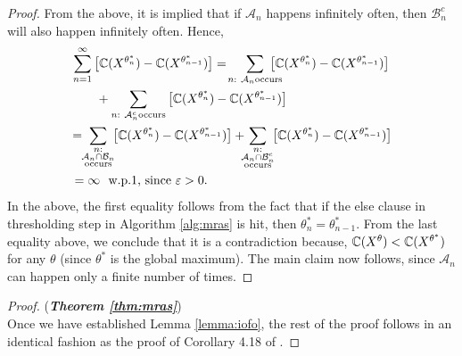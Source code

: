 \begin{proof}
From the above, it is implied that if $\mathcal{A}_n$ happens infinitely often,
then $\mathcal{B}_n^c$ will also happen infinitely often. Hence,
\begin{align*}
&\sum_{n=1}^{\infty}\big[\C(X^{\theta^*_n})-\C(X^{\theta^*_{n-1}})\big] 
=\!\sum_{n:~\mathcal{A}_n \text{occurs}}\!\!\!\!\!\!\!\big[\C(X^{\theta^*_n})-\C(X^{\theta^*_{n-1}})\big]\\
&\qquad+\sum_{n:~\mathcal{A}_n^c \text{occurs}}\big[\C(X^{\theta^*_n})-\C(X^{\theta^*_{n-1}})\big] \\ 
&\!=\!\!\sum_{\substack{n:\\\mathcal{A}_n\cap \mathcal{B}_n\\ \text{occurs}}}\!\!\big[\C(X^{\theta^*_n})-\C(X^{\theta^*_{n-1}})\big] +\!\!\!\sum_{\substack{n:\\\mathcal{A}_n\cap \mathcal{B}_n^c\\ \text{occurs}}}\!\!\big[\C(X^{\theta^*_n})-\C(X^{\theta^*_{n-1}})\big] \\ 
&=\infty \text{~~w.p.1, since $\varepsilon>0$.}
\end{align*}
In the above, the first equality follows from the fact that if the else clause in thresholding step in Algorithm \ref{alg:mras} is hit, then $\theta^*_{n} = \theta^*_{n-1}$.
%
From the last equality above, we conclude that it is a contradiction because, $\mathbb{C}(X^{\theta}) < \mathbb{C}(X^{\theta^*})$ for any $\theta$ (since $\theta^*$ is the global maximum). The main claim now follows, since $\mathcal{A}_n$ can happen only a finite number of times.
\end{proof}

\begin{proof}(\textbf{\textit{Theorem \ref{thm:mras}}})\ \\
Once we have established Lemma \ref{lemma:iofo}, the rest of the proof follows in an identical fashion as the proof of Corollary 4.18 of \cite{chang2013simulation}.
\end{proof}
